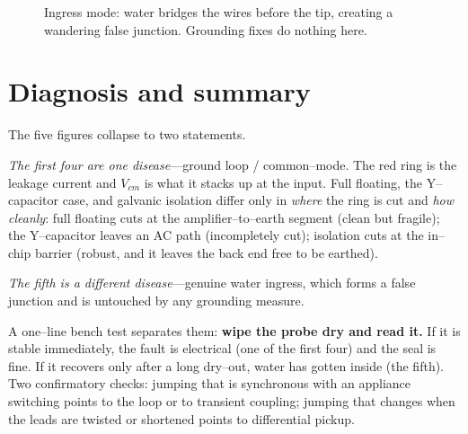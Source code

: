 \documentclass[11pt]{article}
\begin{document}
\begin{figure}[H]
\centering
{}
\caption{Ingress mode: water bridges the wires before the tip, creating a
wandering false junction. Grounding fixes do nothing here.}
\label{fig:ingress}
\end{figure}

\section{Diagnosis and summary}
The five figures collapse to two statements.

\emph{The first four are one disease}---ground loop / common--mode. The red
ring is the leakage current and $V_{cm}$ is what it stacks up at the input.
Full floating, the Y--capacitor case, and galvanic isolation differ only in
\emph{where} the ring is cut and \emph{how cleanly}: full floating cuts at the
amplifier--to--earth segment (clean but fragile); the Y--capacitor leaves an
AC path (incompletely cut); isolation cuts at the in--chip barrier (robust,
and it leaves the back end free to be earthed).

\emph{The fifth is a different disease}---genuine water ingress, which forms a
false junction and is untouched by any grounding measure.

A one--line bench test separates them: \textbf{wipe the probe dry and read it.}
If it is stable immediately, the fault is electrical (one of the first four)
and the seal is fine. If it recovers only after a long dry--out, water has
gotten inside (the fifth). Two confirmatory checks: jumping that is
synchronous with an appliance switching points to the loop or to transient
coupling; jumping that changes when the leads are twisted or shortened points
to differential pickup.
\end{document}
